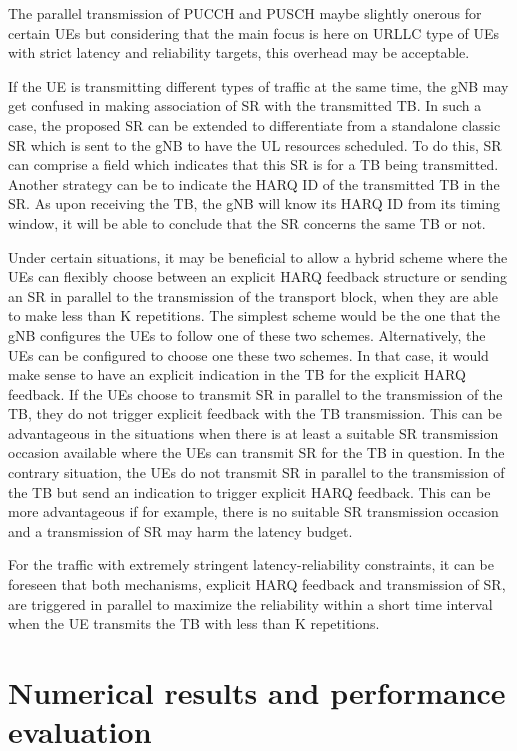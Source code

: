 \documentclass[conference]{IEEEtran}
\begin{document}
The parallel transmission of PUCCH and PUSCH maybe slightly onerous for certain UEs but considering that the main focus is here on URLLC type of UEs with strict latency and reliability targets, this overhead may be acceptable.

If the UE is transmitting different types of traffic at the same time, the gNB may get confused in making association of SR with the transmitted TB. In such a case, the proposed SR can be extended to differentiate from a standalone classic SR which is sent to the gNB to have the UL resources scheduled.  To do this, SR can comprise a field which indicates that this SR is for a TB being transmitted. Another strategy can be to indicate the HARQ ID of the transmitted TB in the SR. As upon receiving the TB, the gNB will know its HARQ ID from its timing window, it will be able to conclude that the SR concerns the same TB or not.

Under certain situations, it may be beneficial to allow a hybrid scheme where the UEs can flexibly choose between an explicit HARQ feedback structure or sending an SR in parallel to the transmission of the transport block, when they are able to make less than K repetitions. The simplest scheme would be the one that the gNB configures the UEs to follow one of these two schemes. Alternatively, the UEs can be configured to choose one these two schemes. In that case, it would make sense to have an explicit indication in the TB for the explicit HARQ feedback. If the UEs choose to transmit SR in parallel to the transmission of the TB, they do not trigger explicit feedback with the TB transmission. This can be advantageous in the situations when there is at least a suitable SR transmission occasion available where the UEs can transmit SR for the TB in question. In the contrary situation, the UEs do not transmit SR in parallel to the transmission of the TB but send an indication to trigger explicit HARQ feedback. This can be more advantageous if for example, there is no suitable SR transmission occasion and a transmission of SR may harm the latency budget.

For the traffic with extremely stringent latency-reliability constraints, it can be foreseen that both mechanisms, explicit HARQ feedback and transmission of SR, are triggered in parallel to maximize the reliability within a short time interval when the UE transmits the TB with less than K repetitions.

\section{Numerical results and performance evaluation}\label{IV}
\end{document}
